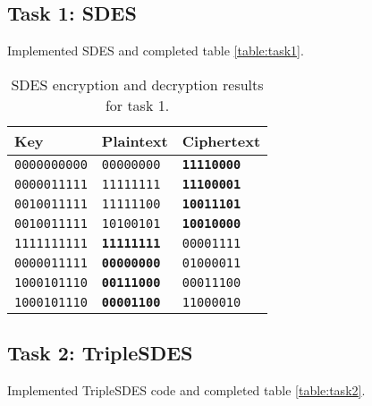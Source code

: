 \documentclass[a4paper,english,12pt]{article}
\begin{document}
\subsection{Task 1: SDES}

Implemented SDES \cite{stallings2006cryptography} and completed table
\vref{table:task1}.

\begin{table}
  \centering
  \begin{tabular}{@{}lll@{}}
    \toprule
    Key &
    Plaintext &
    Ciphertext \\
    \midrule
    \texttt{0000000000} & \texttt{00000000} & \texttt{\textbf{11110000}} \\
    \texttt{0000011111} & \texttt{11111111} & \texttt{\textbf{11100001}} \\
    \texttt{0010011111} & \texttt{11111100} & \texttt{\textbf{10011101}} \\
    \texttt{0010011111} & \texttt{10100101} & \texttt{\textbf{10010000}} \\
    \texttt{1111111111} & \texttt{\textbf{11111111}} & \texttt{00001111} \\
    \texttt{0000011111} & \texttt{\textbf{00000000}} & \texttt{01000011} \\
    \texttt{1000101110} & \texttt{\textbf{00111000}} & \texttt{00011100} \\
    \texttt{1000101110} & \texttt{\textbf{00001100}} & \texttt{11000010} \\
    \bottomrule
  \end{tabular}
  \caption{SDES encryption and decryption results for task 1.}
  \label{table:task1}
\end{table}

\subsection{Task 2: TripleSDES}

Implemented TripleSDES code and completed table \vref{table:task2}.
\end{document}
